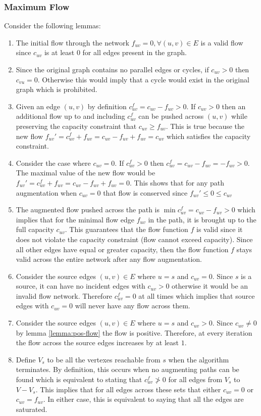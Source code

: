 \documentclass{article}
\begin{document}
\subsubsection{Maximum Flow}
Consider the following lemmas:
\begin{enumerate}
	\item \label{lemma:initial-flow} The initial flow through the network $f_{uv}=0,\forall (u,v)\in E$ is a valid flow since $c_{uv}$ is at least $0$ for all edges present in the graph.
	\item Since the original graph contains no parallel edges or cycles, if $c_{uv}>0$ then $c_{vu}=0$. Otherwise this would imply that a cycle would exist in the original graph which is prohibited.
	\item \label{lemma:pos-flow} Given an edge $(u,v)$ by definition $c_{uv}^f=c_{uv}-f_{uv}>0$. If $c_{uv}>0$ then an additional flow up to and including $c_{uv}^f$ can be pushed across $(u,v)$ while preserving the capacity constraint that $c_{uv}\ge f_{uv}$. This is true because the new flow $f_{uv}'=c_{uv}^f+f_{uv}=c_{uv}-f_{uv}+f_{uv}=c_{uv}$ which satisfies the capacity constraint.
	\item \label{lemma:neg-flow} Consider the case where $c_{uv}=0$. If $c_{uv}^f>0$ then $c_{uv}^f=c_{uv}-f_{uv}=-f_{uv}>0$. The maximal value of the new flow would be $f_{uv}'=c_{uv}^f+f_{uv}=c_{uv}-f_{uv}+f_{uv}=0$. This shows that for any path augmentation when $c_{uv}=0$ that flow is conserved since $f_{uv}'\le 0\le c_{uv}$
	\item \label{lemma:valid-flow} The augmented flow pushed across the path is $\min c_{uv}^f=c_{uv}-f_{uv}>0$ which implies that for the minimal flow edge $f_{uv}$ in the path, it is brought up to the full capacity $c_{uv}$. This guarantees that the flow function $f$ is valid since it does not violate the capacity constraint (flow cannot exceed capacity). Since all other edges have equal or greater capacity, then the flow function $f$ stays valid across the entire network after any flow augmentation.
	\item \label{lemma:source-zero} Consider the source edges $(u,v)\in E$ where $u=s$ and $c_{uv}=0$. Since $s$ is a source, it can have no incident edges with $c_{uv}>0$ otherwise it would be an invalid flow network. Therefore $c_{uv}^f=0$ at all times which implies that source edges with $c_{uv}=0$ will never have any flow across them.
	\item \label{lemma:increasing-flow} Consider the source edges $(u,v)\in E$ where $u=s$ and $c_{uv}>0$. Since $c_{uv}\ne 0$ by lemma \ref{lemma:pos-flow} the flow is positive. Therefore, at every iteration the flow across the source edges increases by at least $1$.
	\item \label{lemma:saturated} Define $V_s$ to be all the vertexes reachable from $s$ when the algorithm terminates. By definition, this occurs when no augmenting paths can be found which is equivalent to stating that $c_{uv}^f\ngtr 0$ for all edges from $V_s$ to $V-V_s$. This implies that for all edges across these sets that either $c_{uv}=0$ or $c_{uv}=f_{uv}$. In either case, this is equivalent to saying that all the edges are saturated.
\end{enumerate}
\end{document}
